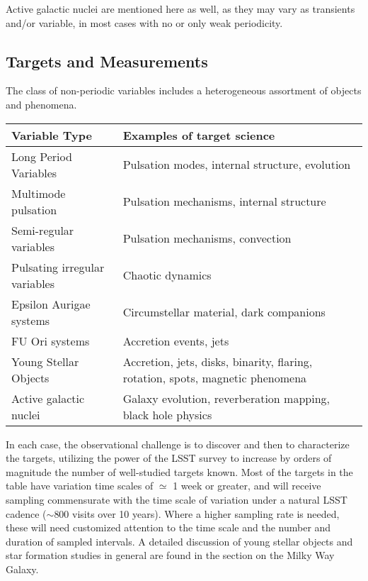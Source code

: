 Active galactic nuclei are mentioned here as well, as they may vary as transients and/or variable, in most cases with no or only weak periodicity.


\subsection{Targets and Measurements}
\label{sec:\secname:targets}

The class of non-periodic variables includes a heterogeneous
assortment of objects and phenomena.

\begin{center}
\begin{tabular}{| p{5cm} | p{10cm} |}
\hline Variable Type & Examples of target science\\
\hline
Long Period Variables & Pulsation modes, internal structure, evolution\\
Multimode pulsation & Pulsation mechanisms, internal structure\\
Semi-regular variables & Pulsation mechanisms, convection \\
Pulsating irregular variables & Chaotic dynamics \\
Epsilon Aurigae systems & Circumstellar material, dark companions\\
FU Ori systems & Accretion events, jets\\
Young Stellar Objects & Accretion, jets, disks, binarity, flaring, rotation, spots, magnetic phenomena\\
Active galactic nuclei & Galaxy evolution, reverberation mapping, black hole physics\\
 \hline \end{tabular}
 \end{center}

In each case, the observational challenge is to discover and then to
characterize the targets, utilizing the power of the LSST survey to
increase by orders of magnitude the number of well-studied targets
known.  Most of the targets in the table have variation time scales of
$\simeq$ 1 week or greater, and will receive sampling commensurate
with the time scale of variation under a natural LSST cadence
($\sim$800 visits over 10 years).  Where a higher sampling rate is
needed, these will need customized attention to the time scale and the
number and duration of sampled intervals. 
A detailed discussion of young stellar objects and star formation studies
in general are found in the section on the Milky Way Galaxy.

